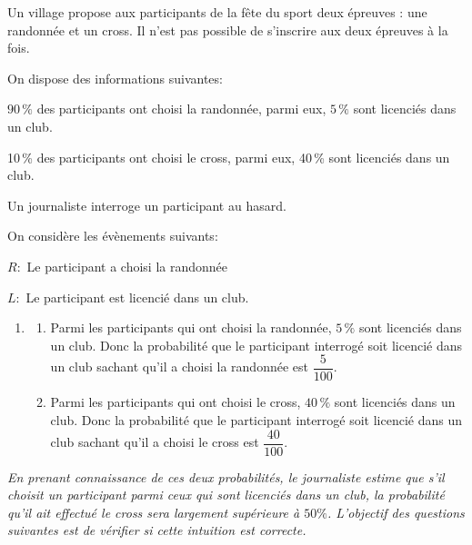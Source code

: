 \medskip

Un village propose aux participants de la fête du sport deux épreuves : une randonnée et un cross. Il n'est pas possible de s'inscrire aux deux épreuves à la fois.

\begin{list}{\textbullet}{On dispose des informations suivantes:}
\item $90\,\%$ des participants ont choisi la randonnée, parmi eux, $5\,\%$ sont licenciés dans un club.
\item 10\,\% des participants ont choisi le cross, parmi eux, 40\,\% sont licenciés dans un club.
\end{list}

Un journaliste interroge un participant au hasard.

\begin{list}{\textbullet}{On considère les évènements suivants:}
\item $R:$ \og  Le participant a choisi la randonnée \fg{}
\item $L:$ \og Le participant est licencié dans un club\fg{}.
\end{list}

\begin{enumerate}
\item 
	\begin{enumerate}
		\item 
Parmi les participants qui ont choisi la randonnée, $5\,\%$ sont licenciés dans un club.		
Donc la probabilité que le participant interrogé soit licencié dans un club sachant qu'il a choisi la randonnée est $\dfrac{5}{100}$.

		\item 
Parmi les participants qui ont choisi le cross, $40\,\%$ sont licenciés dans un club.		
Donc la probabilité que le participant interrogé soit licencié dans un club sachant qu'il a choisi le cross est $\dfrac{40}{100}$.
		
\end{enumerate}
\end{enumerate}

\textit{En prenant connaissance de ces deux probabilités, le journaliste estime que s'il choisit un participant parmi ceux qui sont licenciés dans un club, la probabilité qu'il ait effectué le cross sera largement supérieure à $50 \%$. L'objectif des questions suivantes est de vérifier si cette intuition est correcte.}

